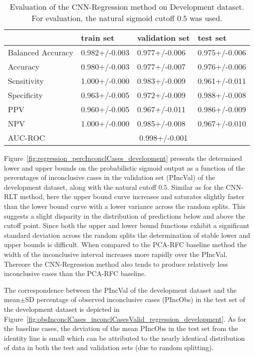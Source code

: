 \begin{table}[ht]
  \caption{Evaluation of the CNN-Regression method on Development dataset. 
  For evaluation, the natural sigmoid cutoff $0.5$ was used.}
  \centering
  \begin{tabular}{llll}
      \hline
                        & train set         & validation set      & test set             \\
      \hline
      Balanced Accuracy & 0.982+/-0.003   &  0.977+/-0.006    &  0.975+/-0.006 \\
      Accuracy          & 0.980+/-0.003     &   0.977+/-0.007   &  0.976+/-0.006  \\
      Sensitivity       &  1.000+/-0.000   &   0.983+/-0.009   &  0.961+/-0.011 \\
      Specificity       &   0.963+/-0.005  &   0.972+/-0.009 &   0.988+/-0.008 \\
      PPV               &  0.960+/-0.005    &   0.967+/-0.011  &  0.986+/-0.009  \\
      NPV               &  1.000+/-0.000  &   0.985+/-0.008   & 0.967+/-0.010 \\
      \hline
      AUC-ROC          &  \multicolumn{3}{c}{0.998+/-0.001}  \\
      \hline
  \end{tabular}
 \label{t1:cnn_regression_perf_eval_table}
\end{table}


Figure~\ref{fig:regression_percInconclCases_development} presents the determined lower and upper bounds on the 
probabilistic sigmoid output as a function of the percentages of inconclusive cases 
in the validation set (PIncVal) of the development dataset, along with the natural cutoff $0.5$.
Similar as for the CNN-RLT method, 
here the upper bound curve increases and saturates slightly faster than the lower bound curve with a lower variance across 
the random splits.
This suggests a slight disparity in the distribution of predictions below and above the cutoff point.
Since both the upper and lower bound functions exhibit a significant standard deviation across the random splits 
the determination of stable lower and upper bounds is difficult.
When compared to the PCA-RFC baseline method 
the width of the inconclusive interval increases more rapidly over the PIncVal.
Thereore the CNN-Regression method also tends to produce relatively less inconclusive cases than the PCA-RFC baseline.

The correspondence between the PIncVal of the development dataset \linebreak 
and the mean$\pm$SD percentage of observed inconclusive cases (PIncObs) in the test set of the development dataset 
is depicted in Figure~\ref{fig:obsInconclCases_inconclCasesValid_regression_development}.
As for the baseline cases, the deviation of the mean PIncObs in the test set from the 
identity line is small which can be attributed to the nearly identical distribution of data in both the test and validation sets 
(due to random splitting).


